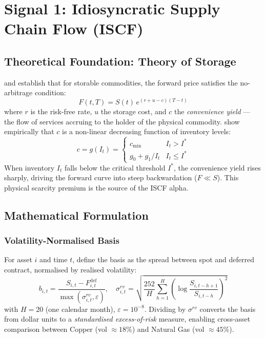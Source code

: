 \documentclass[12pt,a4paper]{article}
\begin{document}
\section{Signal 1: Idiosyncratic Supply Chain Flow (ISCF)}
\label{sec:iscf}

\subsection{Theoretical Foundation: Theory of Storage}

\citet{working1949} and \citet{fama1988} establish that for storable commodities, the forward price satisfies the no-arbitrage condition:
\begin{equation}
  F(t, T) = S(t)\,e^{(r + u - c)(T-t)}
  \label{eq:storagecost}
\end{equation}
where $r$ is the risk-free rate, $u$ the storage cost, and $c$ the \emph{convenience yield} — the flow of services accruing to the holder of the physical commodity. \citeauthor{fama1988} show empirically that $c$ is a non-linear decreasing function of inventory levels:
\begin{equation}
  c = g(I_t) = \begin{cases}
    c_{\min} & I_t > I^* \\
    g_0 + g_1 / I_t & I_t \leq I^* \end{cases}
  \label{eq:convenience}
\end{equation}
When inventory $I_t$ falls below the critical threshold $I^*$, the convenience yield rises sharply, driving the forward curve into steep backwardation ($F \ll S$). This physical scarcity premium is the source of the ISCF alpha.

\subsection{Mathematical Formulation}

\subsubsection{Volatility-Normalised Basis}

For asset $i$ and time $t$, define the basis as the spread between spot and deferred contract, normalised by realised volatility:
\begin{equation}
  b_{i,t} = \frac{S_{i,t} - F_{i,t}^{\text{def}}}{\max(\sigma_{i,t}^{rv}, \varepsilon)},
  \quad \sigma_{i,t}^{rv} = \sqrt{\frac{252}{H}\sum_{h=1}^{H}\left(\log\frac{S_{i,t-h+1}}{S_{i,t-h}}\right)^2}
  \label{eq:basis}
\end{equation}
with $H=20$ (one calendar month), $\varepsilon = 10^{-8}$. Dividing by $\sigma^{rv}$ converts the basis from dollar units to a \emph{standardised excess-of-risk} measure, enabling cross-asset comparison between Copper (vol $\approx 18\%$) and Natural Gas (vol $\approx 45\%$).
\end{document}
